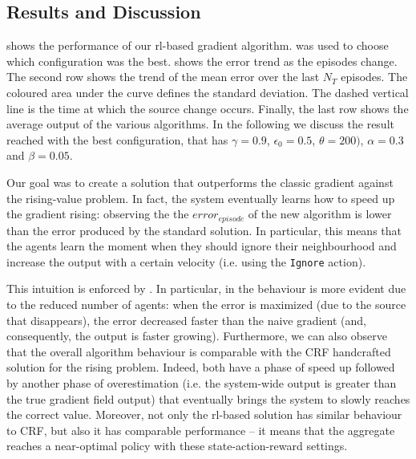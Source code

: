 
\subsection{Results and Discussion}

 shows the performance of our \acl{rl}-based gradient algorithm.
%
 was used to choose which configuration was the best.
%
 shows the error trend as the episodes change. 
%
The second row shows the trend of the mean error over the last $N_T$ episodes. 
%
The coloured area under the curve defines the standard deviation. 
%
The dashed vertical line is the time at which the source change occurs. 
%
Finally, the last row shows the average output of the various algorithms. 
%
In the following we discuss the result reached with the best configuration, that has $\gamma = 0.9$, $\epsilon_0 = 0.5$, $\theta = 200)$, $\alpha=0.3$ and $\beta=0.05$. 

Our goal was to create a solution that outperforms the classic gradient against the rising-value problem.
%
In fact, the system eventually learns how to speed up the gradient rising: observing the  the $error_{episode}$ of the new algorithm is lower than the error produced by the standard solution. 
%
In particular, this means that the agents learn the moment when they should ignore their neighbourhood and increase the output with a certain velocity (i.e. using the \lstinline|Ignore| action).

This intuition is enforced by .
% 
In particular, in  the behaviour is more evident due to the reduced number of agents: when the error is maximized (due to the source that disappears), the error decreased faster than the naive gradient (and, consequently, the output is faster growing).
%
Furthermore, we can also observe that the overall algorithm behaviour is comparable with the CRF handcrafted solution for the rising problem. 
%
Indeed, both have a phase of speed up followed by another phase of overestimation (i.e. the system-wide output is greater than the true gradient field output) that eventually brings the system to slowly reaches the correct value.
%
Moreover, not only the \ac{rl}-based solution has similar behaviour to CRF, but also it has comparable performance -- it means that the aggregate reaches a near-optimal policy with these state-action-reward settings.

